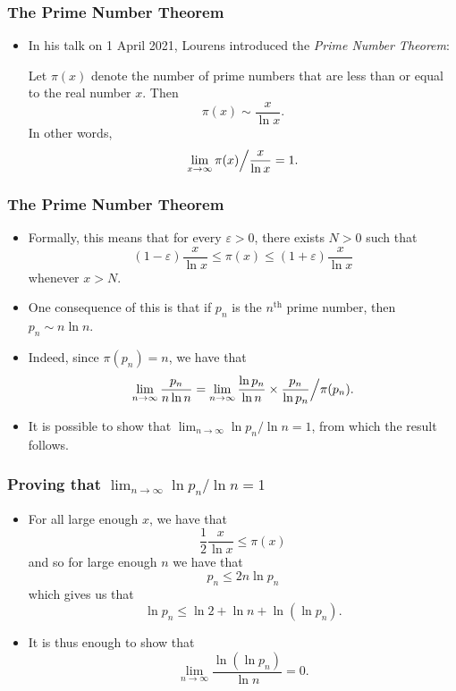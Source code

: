 \documentclass{beamer}
\begin{document}
\begin{frame}
    \frametitle{The Prime Number Theorem}

    \begin{itemize}
        \item In his talk on 1 April 2021, Lourens introduced the \emph{Prime Number Theorem}:
        \begin{theorem}
            Let $\pi(x)$ denote the number of prime numbers that are less than or equal to the real number $x$. Then
            \[
                \pi(x) \sim \frac{x}{\ln x}.    
            \]
            In other words,
            \[
                \lim_{x \to \infty} \pi(x) \Big\slash \frac{x}{\ln x} = 1.
            \]
        \end{theorem}
    \end{itemize}

\end{frame}

\begin{frame}
    \frametitle{The Prime Number Theorem}

    \begin{itemize}
        \item Formally, this means that for every $\varepsilon > 0$, there exists $N > 0$ such that
        \[
            (1 - \varepsilon) \frac{x}{\ln x} \leq \pi(x) \leq (1 + \varepsilon) \frac{x}{\ln x}    
        \]
        whenever $x > N$. \pause
        \item One consequence of this is that if $p_n$ is the $n^\text{th}$ prime number, then $p_n \sim n \ln n$. \pause
        \item Indeed, since $\pi(p_n) = n$, we have that
        \[
            \lim_{n \to \infty} \frac{p_n}{n \ln n} = \lim_{n \to \infty} \frac{\ln p_n}{\ln n} \times \frac{p_n}{\ln p_n} \Big\slash \pi(p_n).
        \]
        \pause
        \item It is possible to show that $\lim_{n \to \infty} \ln p_n \slash \ln n = 1$, from which the result follows.
    \end{itemize} 

\end{frame}

\begin{frame}
    \frametitle{Proving that $\lim_{n \to \infty} \ln p_n \slash \ln n = 1$}

    \begin{itemize}
        \item For all large enough $x$, we have that
        \[
            \frac{1}{2} \frac{x}{\ln x} \leq \pi(x)    
        \]
        and so for large enough $n$ we have that
        \[
            p_n \leq 2 n \ln p_n 
        \]
        which gives us that
        \[
            \ln p_n \leq \ln 2 + \ln n + \ln(\ln p_n).
        \]
        \pause
        \item It is thus enough to show that
        \[
            \lim_{n \to \infty} \frac{\ln(\ln p_n)}{\ln n} = 0.    
        \] 
    \end{itemize} 

\end{frame}
\end{document}
